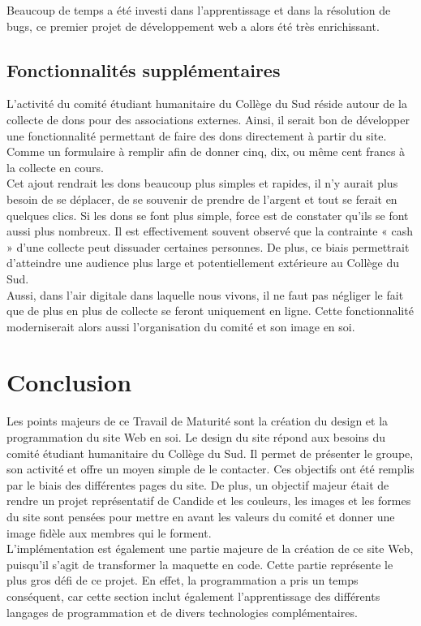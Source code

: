 \documentclass[a4,10pt,french]{sphinxmanual}
\begin{document}
\sphinxAtStartPar
Beaucoup de temps a été investi dans l’apprentissage et dans la résolution de bugs, ce premier projet de développement web a alors été très enrichissant.


\section{Fonctionnalités supplémentaires}
\label{\detokenize{chapitre-03:fonctionnalites-supplementaires}}
\sphinxAtStartPar
L’activité du comité étudiant humanitaire du Collège du Sud réside autour de la collecte de dons pour des associations externes. Ainsi, il serait bon de développer une fonctionnalité permettant de faire des dons directement à partir du site. Comme un formulaire à remplir afin de donner cinq, dix, ou même cent francs à la collecte en cours.\\
Cet ajout rendrait les dons beaucoup plus simples et rapides, il n’y aurait plus besoin de se déplacer, de se souvenir de prendre de l’argent et tout se ferait en quelques clics. Si les dons se font plus simple, force est de constater qu’ils se font aussi plus nombreux. Il est effectivement souvent observé que la contrainte « cash » d’une collecte peut dissuader certaines personnes. De plus, ce biais permettrait d’atteindre une audience plus large et potentiellement extérieure au Collège du Sud.\\
Aussi, dans l’air digitale dans laquelle nous vivons, il ne faut pas négliger le fait que de plus en plus de collecte se feront uniquement en ligne. Cette fonctionnalité moderniserait alors aussi l’organisation du comité et son image en soi.


\chapter{Conclusion}
\label{\detokenize{chapitre-04:conclusion}}\label{\detokenize{chapitre-04::doc}}
\sphinxAtStartPar
Les points majeurs de ce Travail de Maturité sont la création du design et la programmation du site Web en soi.
Le design du site répond aux besoins du comité étudiant humanitaire du Collège du Sud. Il permet de présenter le groupe, son activité et offre un moyen simple de le contacter. Ces objectifs ont été remplis par le biais des différentes pages du site. De plus, un objectif majeur était de rendre un projet représentatif de Candide et les couleurs, les images et les formes du site sont pensées pour mettre en avant les valeurs du comité et donner une image fidèle aux membres qui le forment.\\
L’implémentation est également une partie majeure de la création de ce site Web, puisqu’il s’agit de transformer la maquette en code. Cette partie représente le plus gros défi de ce projet. En effet, la programmation a pris un temps conséquent, car cette section inclut également l’apprentissage des différents langages de programmation et de divers technologies complémentaires.
\end{document}
